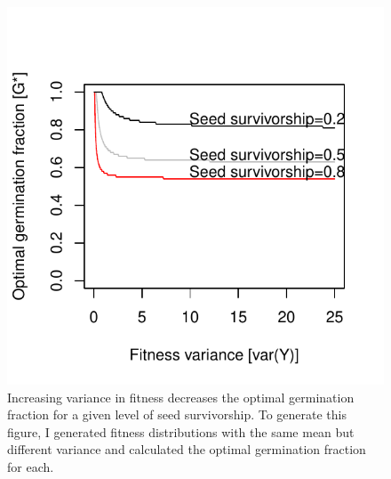 \documentclass[12pt, oneside, titlepage]{article}   	%
\begin{document}
 \begin{figure}[h]
   \centering
       \includegraphics[page=1]{../figures/appendix-x-fitnessvariance.pdf}  
    \caption{ Increasing variance in fitness decreases the optimal germination fraction for a given level of seed survivorship. To generate this figure, I generated fitness distributions with the same mean but different variance and calculated the optimal germination fraction for each.  }
 \label{fig:variance}
\end{figure}
%
\end{document}
